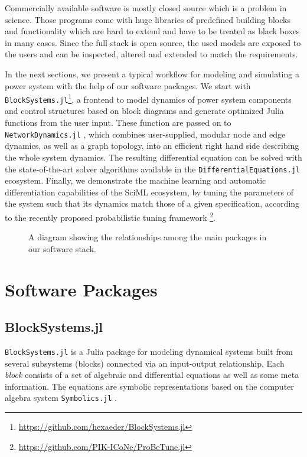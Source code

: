 \documentclass[conference]{IEEEtran}
\begin{document}
Commercially available software is mostly closed source which is a problem in science. 
Those programs come with huge libraries of predefined building blocks and functionality which are hard to extend and have to be treated as black boxes in many cases.
Since the full stack is open source, the used models are exposed to the users and can be inspected, altered and extended to match the requirements.

In the next sections, we present a typical workflow for modeling and simulating a power system with the help of our software packages.
We start with \texttt{BlockSystems.jl}\footnote{\url{https://github.com/hexaeder/BlockSystems.jl}}, a frontend to model dynamics of power system components and control structures based on block diagrams and generate optimized Julia functions from the user input. These function are passed on to \texttt{NetworkDynamics.jl} \cite{lindner2021networkdynamics}, which combines user-supplied, modular node and edge dynamics, as well as a graph topology, into an efficient right hand side describing the whole system dynamics. The resulting differential equation can be solved with the state-of-the-art solver algorithms available in the \texttt{DifferentialEquations.jl} ecosystem. Finally, we demonstrate the machine learning and automatic differentiation capabilities of the SciML ecosystem, by tuning the parameters of the system such that its dynamics match those of a given specification, according to the recently proposed probabilistic tuning framework \cite{hellmann2021probetune}\footnote{\url{https://github.com/PIK-ICoNe/ProBeTune.jl}}.

\begin{figure}%
\centering
\scalebox{0.6}{}
  \caption{A diagram showing the relationships among the main packages in our software stack. \label{fig:softwarestack}}
\end{figure}

\section{Software Packages}

\subsection{BlockSystems.jl}
\texttt{BlockSystems.jl} is a Julia package for modeling dynamical systems built from several subsystems (blocks) connected via an input-output relationship.
Each \emph{block} consists of a set of algebraic and differential equations as well as some meta information. The equations are symbolic representations based on the computer algebra system \texttt{Symbolics.jl} \cite{gowda2021high}.
\end{document}
